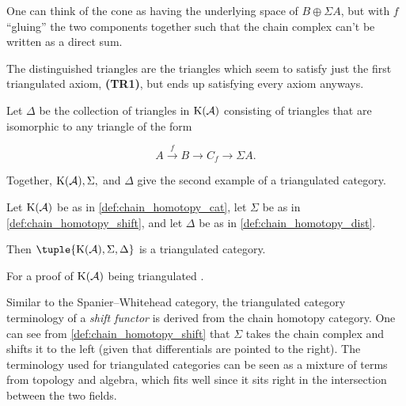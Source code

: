 One can think of the cone as having the underlying space of \( B \oplus \Sigma A \), but with \( f \) ``gluing'' the two components together such that the chain complex can't be written as a direct sum.

The distinguished triangles are the triangles which seem to satisfy just the first triangulated axiom, {\bf (TR1)}, but ends up satisfying every axiom anyways.

\begin{definition}
    \label{def:chain_homotopy_dist}
    Let \( \Delta \) be the collection of triangles in \( \operatorname{K}({\mathcal{A}}) \) consisting of triangles that are isomorphic to any triangle of the form

    \[
        A \stackrel{f}{\to} B \to C_f \to \Sigma A.
    \]
\end{definition}

Together, \( \operatorname{K}({\mathcal{A}}), \Sigma, \) and \( \Delta \) give the second example of a triangulated category.

\begin{example}
    Let \( \operatorname{K}({\mathcal{A}}) \) be as in \autoref{def:chain_homotopy_cat}, let \( \Sigma \) be as in \autoref{def:chain_homotopy_shift}, and let \( \Delta \) be as in \autoref{def:chain_homotopy_dist}.

    Then \( \tuple{\K(\Ac), \Sigma, \Delta} \) is a triangulated category.
\end{example}
For a proof of \( \operatorname{K}({\mathcal{A}}) \) being triangulated \cite[Proposition 3.5.25]{Zimmermann_2014}.

Similar to the Spanier--Whitehead category, the triangulated category terminology of a \emph{shift functor} is derived from the chain homotopy category. One can see from \autoref{def:chain_homotopy_shift} that \( \Sigma \) takes the chain complex and shifts it to the left (given that differentials are pointed to the right). The terminology used for triangulated categories can be seen as a mixture of terms from topology and algebra, which fits well since it sits right in the intersection between the two fields.
